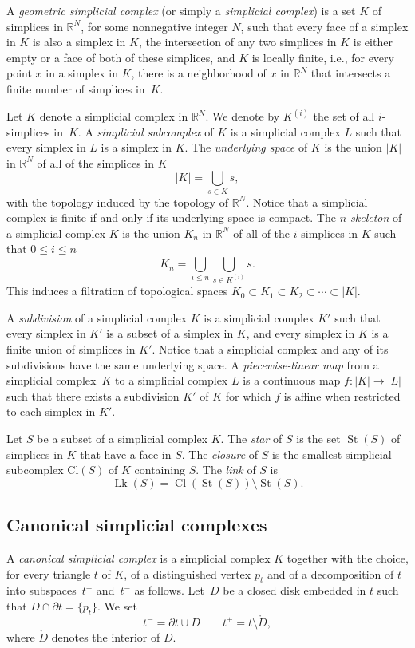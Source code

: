 \documentclass[a4paper, oneside]{amsart}
\newcommand{\R}{\mathbb{R}}
\numberwithin{equation}{subsection}
\theoremstyle{referencedlemma}
\theoremstyle{plain} %
\theoremstyle{remark}
\begin{document}
A \emph{geometric simplicial complex} (or simply a \emph{simplicial complex}) is a set $K$ of simplices in $\R^N$, for some nonnegative integer $N$, such that every face of a simplex in $K$ is also a simplex in $K$,  the intersection of any two simplices in $K$ is either empty or a face of both of these simplices, and $K$ is locally finite, i.e.,  for every point $x$ in a simplex in $K$, there is a neighborhood of $x$ in $\R^N$ that intersects a finite number of simplices in~$K$.  

Let $K$ denote a simplicial complex in $\R^N$. We denote by $K^{(i)}$ the set of all $i$-simplices in~$K$.  A \emph{simplicial subcomplex} of $K$ is a simplicial complex $L$ such that every simplex in $L$ is a simplex in $K$.  The \emph{underlying space} of $K$ is the union $\lvert K \rvert$ in $\R^N$ of all of the simplices in $K$
$$
\lvert K \rvert = \bigcup_{s\in K}s,
$$
with the topology induced by the topology of $\R^N$.  Notice that a simplicial complex is finite if and only if its underlying space is compact.  The \emph{$n$-skeleton} of a simplicial complex $K$ is the union $K_n$ in $\R^N$ of all of the $i$-simplices in $K$ such that $0 \leqslant i\leqslant n$
$$
K_n = \bigcup_{i\leqslant n}\bigcup_{s\in K^{(i)}} s. 
$$
This induces a filtration of topological spaces $K_0 \subset K_1 \subset K_2 \subset \cdots \subset \lvert K \rvert$. 

A \emph{subdivision} of a simplicial complex $K$ is a simplicial complex $K'$ such that every simplex in $K'$ is a subset of a simplex in $K$, and every simplex in $K$ is a finite union of simplices in $K'$.  Notice that a simplicial complex and any of its subdivisions have the same underlying space.  A \emph{piecewise-linear map} from a simplicial complex~$K$ to a simplicial complex $L$ is a continuous map $f\colon \lvert K\rvert \to \lvert L \rvert$ such that there exists a subdivision $K'$ of $K$ for which $f$ is affine when restricted to each simplex in $K'$. 


Let $S$ be a subset of a simplicial complex $K$.  The \emph{star} of $S$ is the set $\operatorname{St}(S)$ of simplices in $K$ that have a face in $S$.  The \emph{closure} of $S$ is the smallest simplicial subcomplex $\mathrm{Cl}(S)$ of $K$ containing $S$.  The \emph{link} of $S$ is
$$
\operatorname{Lk}(S) = \operatorname{Cl}(\operatorname{St}(S))\setminus \operatorname{St}(S).
$$


\subsection{Canonical simplicial complexes}\label{Canonical simplicial complexes}A \emph{canonical simplicial complex} is a simplicial complex $K$ together with the choice,  for every triangle $t$ of $K$,  of a distinguished vertex $p_t$ and of a decomposition of $t$ into subspaces~$t^+$ and~$t^-$ as follows.  Let~$D$ be a closed disk embedded in $t$ such that $D\cap \partial t = \{p_t\}$.  We set 
$$
t^- = \partial t \cup D \quad \quad t^+ = t \setminus \mathring{D},
$$
where $\mathring{D}$ denotes the interior of $D$.  
\end{document}
